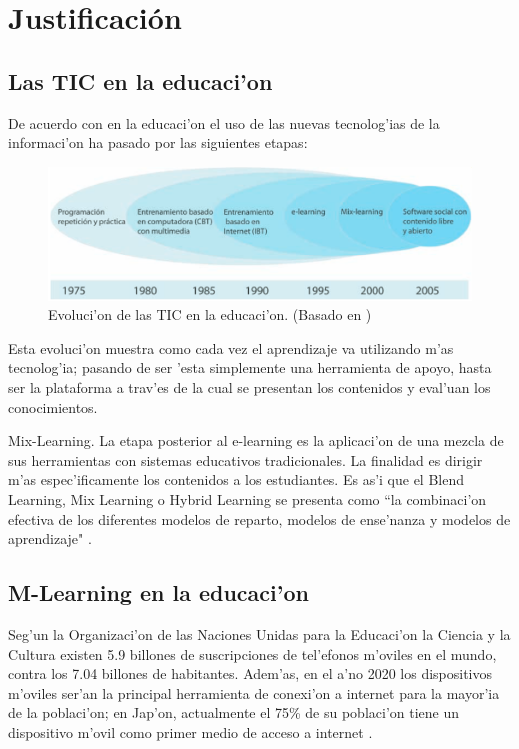 \chapter{Justificación}
\section{Las TIC en la educaci'on}
De acuerdo con \cite{palaciostics} en la educaci'on el uso de las nuevas tecnolog'ias de la informaci'on ha pasado por las siguientes etapas:

\begin{figure}
	\begin{center}
		\includegraphics[scale=0.5]{img/img1.png} 
		\caption{Evoluci'on de las TIC en la educaci'on. (Basado en \cite{palaciostics})}
		\label{tic}
	\end{center}
\end{figure}

Esta evoluci'on muestra como cada vez el aprendizaje va utilizando m'as tecnolog'ia; pasando de ser 'esta simplemente una herramienta de apoyo, hasta ser la plataforma a trav'es de la cual se presentan los contenidos y eval'uan los conocimientos. 

Mix-Learning. La etapa posterior al e-learning es la aplicaci'on de una mezcla de sus herramientas con sistemas educativos tradicionales. La finalidad es dirigir m'as espec'ificamente los contenidos a los estudiantes. Es as'i que el Blend Learning, Mix Learning o Hybrid Learning se presenta como ``la combinaci'on efectiva de los diferentes modelos de reparto, modelos de ense'nanza y modelos de aprendizaje" \citep{olivares2016tic}.

\section{M-Learning en la educaci'on}
Seg'un la Organizaci'on de las Naciones Unidas para la Educaci'on la Ciencia y la Cultura \citep{dykes2012mobile} existen 5.9 billones de suscripciones de tel'efonos m'oviles en el mundo, contra los 7.04 billones de habitantes. Adem'as, en el a'no 2020 los dispositivos m'oviles ser'an la principal herramienta de conexi'on a internet para la mayor'ia de la poblaci'on; en Jap'on, actualmente el 75\% de su poblaci'on tiene un dispositivo m'ovil como primer medio de acceso a internet \citep{camacho2011m}. 

